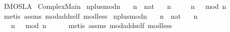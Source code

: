 %
\begin{isabellebody}%
%
%
\isadelimdocument
%
\endisadelimdocument
%
\isatagdocument
%
\isamarkuptrue%
%
\isamarkuptrue%
%
\endisatagdocument
{\isafolddocument}%
%
\isadelimdocument
%
\endisadelimdocument
%
\isadelimtheory
%
\endisadelimtheory
%
\isatagtheory
{}\isamarkupfalse%
\ IMO{\isacharunderscore}{}{}{}{}{\isacharunderscore}SL{\isacharunderscore}A{}\isanewline
{}\ Complex{\isacharunderscore}Main\isanewline
{}%
\endisatagtheory
{\isafoldtheory}%
%
\isadelimtheory
\isanewline
%
\endisadelimtheory
\isanewline
{}\isamarkupfalse%
\ n{\isacharunderscore}plus{\isacharunderscore}{}{\isacharunderscore}mod{\isacharunderscore}n{\isacharcolon}\isanewline
\ \ \ n\ {\isacharcolon}{\isacharcolon}\ nat\isanewline
\ \ \ {\isachardoublequoteopen}n\ {\isachargreater}\ {}{\isachardoublequoteclose}\isanewline
\ \ \ {\isachardoublequoteopen}{\isacharparenleft}n\ {\isacharplus}\ {}{\isacharparenright}\ mod\ n\ {\isacharequal}\ {}{\isachardoublequoteclose}\isanewline
%
\isadelimproof
\ \ %
\endisadelimproof
%
\isatagproof
{}\isamarkupfalse%
\ {\isacharparenleft}metis\ assms\ mod{\isacharunderscore}add{\isacharunderscore}self{}\ mod{\isacharunderscore}less{\isacharparenright}%
\endisatagproof
{\isafoldproof}%
%
\isadelimproof
\isanewline
%
\endisadelimproof
\isanewline
{}\isamarkupfalse%
\ n{\isacharunderscore}plus{\isacharunderscore}{}{\isacharunderscore}mod{\isacharunderscore}n{\isacharcolon}\isanewline
\ \ \ n\ {\isacharcolon}{\isacharcolon}\ nat\isanewline
\ \ \ {\isachardoublequoteopen}n\ {\isachargreater}\ {}{\isachardoublequoteclose}\isanewline
\ \ \ {\isachardoublequoteopen}{\isacharparenleft}n\ {\isacharplus}\ {}{\isacharparenright}\ mod\ n\ {\isacharequal}\ {}{\isachardoublequoteclose}\isanewline
%
\isadelimproof
\ \ %
\endisadelimproof
%
\isatagproof
{}\isamarkupfalse%
\ {\isacharparenleft}metis\ assms\ mod{\isacharunderscore}add{\isacharunderscore}self{}\ mod{\isacharunderscore}less{\isacharparenright}%

\end{isabellebody}
